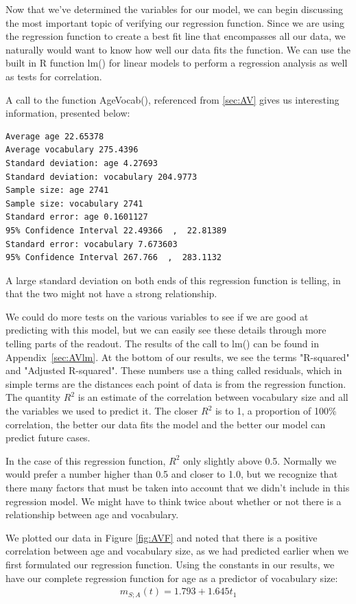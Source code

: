 \documentclass[11pt]{article}  %
\begin{document}
\indent Now that we've determined the variables for our model, we can begin discussing the most important topic of verifying our regression function. Since we are using the regression function to create a best fit line that encompasses all our data, we naturally would want to know how well our data fits the function. We can use the built in R function lm() for linear models to perform a regression analysis as well as tests for correlation.

\indent A call to the function AgeVocab(), referenced from \ref{sec:AV} gives us interesting information, presented below:
\begin{lstlisting}
Average age 22.65378 
Average vocabulary 275.4396 
Standard deviation: age 4.27693 
Standard deviation: vocabulary 204.9773 
Sample size: age 2741 
Sample size: vocabulary 2741 
Standard error: age 0.1601127 
95% Confidence Interval 22.49366  ,  22.81389 
Standard error: vocabulary 7.673603 
95% Confidence Interval 267.766  ,  283.1132 
\end{lstlisting}
A large standard deviation on both ends of this regression function is telling, in that the two might not have a strong relationship.

\indent We could do more tests on the various variables to see if we are good at predicting with this model, but we can easily see these details through more telling parts of the readout. The results of the call to lm() can be found in Appendix~\ref{sec:AVlm}. At the bottom of our results, we see the terms "R-squared" and "Adjusted R-squared". These numbers use a thing called residuals, which in simple terms are the distances each point of data is from the regression function. The quantity $R^2$ is an estimate of the correlation between vocabulary size and all the variables we used to predict it. The closer $R^2$ is to 1, a proportion of 100\% correlation, the better our data fits the model and the better our model can predict future cases.

\indent In the case of this regression function, $R^2$ only slightly above 0.5. Normally we would prefer a number higher than 0.5 and closer to 1.0, but we recognize that there many factors that must be taken into account that we didn't include in this regression model. We might have to think twice about whether or not there is a relationship between age and vocabulary.

\indent We plotted our data in Figure \ref{fig:AVF} and noted that there is a positive correlation between age and vocabulary size, as we had predicted earlier when we first formulated our regression function. Using the constants in our results, we have our complete regression function for age as a predictor of vocabulary size:
    \begin{align*}
        m_{S;A}(t) = 1.793 + 1.645 t_1
    \end{align*}
\end{document}
